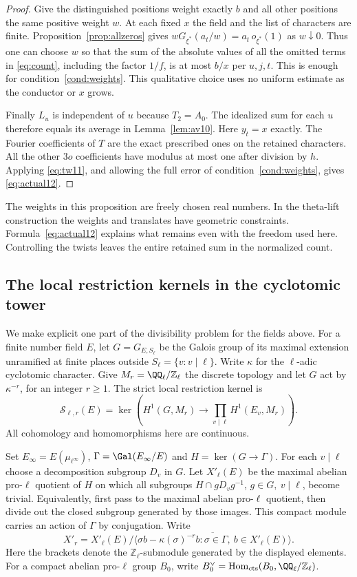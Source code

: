 \documentclass[a4paper,11pt]{article}
\theoremstyle{definition}
\theoremstyle{remark}
\newcommand{\ZZ}{\mathbb Z}\newcommand{\ord}{\operatorname{ord}}
\numberwithin{equation}{section}
\begin{document}
\begin{proof}
Give the distinguished positions weight exactly \(b\) and all other positions the same positive weight \(w\). At each fixed \(x\) the field and the list of characters are finite. Proposition~\ref{prop:allzeros} gives \(wG_{\xi^*}(a_t/w)=a_t\,o_{\xi^*}(1)\) as \(w\downarrow0\). Thus one can choose \(w\) so that the sum of the absolute values of all the omitted terms in \eqref{eq:count}, including the factor \(1/f\), is at most \(b/x\) per \(u,j,t\). This is enough for condition~\ref{cond:weights}. This qualitative choice uses no uniform estimate as the conductor or \(x\) grows.

Finally \(L_u\) is independent of \(u\) because \(T_2=A_0\). The idealized sum for each \(u\) therefore equals its average in Lemma~\ref{lem:av10}. Here \(y_t=x\) exactly. The Fourier coefficients of \(T\) are the exact prescribed ones on the retained characters. All the other \(3o\) coefficients have modulus at most one after division by \(h\). Applying \eqref{eq:tw11}, and allowing the full error of condition~\ref{cond:weights}, gives \eqref{eq:actual12}.
\end{proof}
The weights in this proposition are freely chosen real numbers. In the theta-lift construction the weights and translates have geometric constraints. Formula~\eqref{eq:actual12} explains what remains even with the freedom used here. Controlling the twists leaves the entire retained sum in the normalized count.

\subsection{The local restriction kernels in the cyclotomic tower}\label{nav:I-26}
\label{sec:coho12}
We make explicit one part of the divisibility problem for the fields above. For a finite number field \(E\), let \(G=G_{E,S_\ell}\) be the Galois group of its maximal extension unramified at finite places outside \(S_\ell=\{v:v\mid\ell\}\). Write \(\kappa\) for the \(\ell\)-adic cyclotomic character. Give \(M_r=\QQ_\ell/\ZZ_\ell\) the discrete topology and let \(G\) act by \(\kappa^{-r}\), for an integer \(r\ge1\). The strict local restriction kernel is
\[
 \mathcal S_{\ell,r}(E)=
 \ker\left(H^1(G,M_r)\longrightarrow
                          \prod_{v\mid\ell}H^1(E_v,M_r)\right).
\]
All cohomology and homomorphisms here are continuous.

Set \(E_\infty=E(\mu_{\ell^\infty})\), \(\Gamma=\Gal(E_\infty/E)\) and \(H=\ker(G\to\Gamma)\). For each \(v\mid\ell\) choose a decomposition subgroup \(D_v\) in \(G\). Let \(X'_\ell(E)\) be the maximal abelian pro-\(\ell\) quotient of \(H\) on which all subgroups \(H\cap gD_vg^{-1}\), \(g\in G,\ v\mid\ell\), become trivial. Equivalently, first pass to the maximal abelian pro-\(\ell\) quotient, then divide out the closed subgroup generated by those images. This compact module carries an action of \(\Gamma\) by conjugation. Write
\[
 X'_r=X'_\ell(E)\big/
   \overline{\langle \sigma b-\kappa(\sigma)^{-r}b:
                          \sigma\in\Gamma,\ b\in X'_\ell(E)\rangle}.
\]
Here the brackets denote the \(\ZZ_\ell\)-submodule generated by the displayed elements. For a compact abelian pro-\(\ell\) group \(B_0\), write \(B_0^\vee=\operatorname{Hom}_{\rm cts}(B_0,\QQ_\ell/\ZZ_\ell)\).
\end{document}
